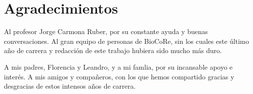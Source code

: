 \section*{Agradecimientos}
\label{sec:agradecimientos}

Al profesor Jorge Carmona Ruber, por su constante ayuda y buenas conversaciones.
Al gran equipo de personas de BioCoRe, sin los cuales este último año de carrera
y redacción de este trabajo hubiera sido mucho más duro.

A mis padres, Florencia y Leandro, y a mi famlia, por su incansable apoyo e
interés. A mis amigos y compañeros, con los que hemos compartido gracias y
desgracias de estos intensos años de carrera.

